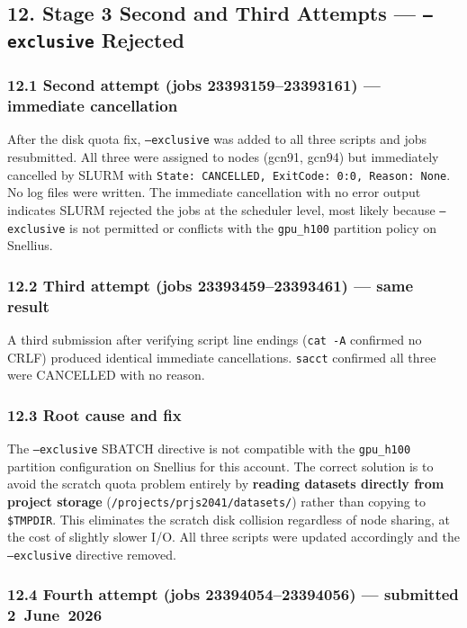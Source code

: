 \subsection*{12. Stage 3 Second and Third Attempts — \texttt{--exclusive} Rejected}

\subsubsection*{12.1 Second attempt (jobs 23393159--23393161) — immediate cancellation}

After the disk quota fix, \texttt{--exclusive} was added to all three scripts
and jobs resubmitted. All three were assigned to nodes (gcn91, gcn94) but
immediately cancelled by SLURM with \texttt{State: CANCELLED, ExitCode: 0:0,
Reason: None}. No log files were written. The immediate cancellation with no
error output indicates SLURM rejected the jobs at the scheduler level, most
likely because \texttt{--exclusive} is not permitted or conflicts with the
\texttt{gpu\_h100} partition policy on Snellius.

\subsubsection*{12.2 Third attempt (jobs 23393459--23393461) — same result}

A third submission after verifying script line endings (\texttt{cat -A}
confirmed no CRLF) produced identical immediate cancellations.
\texttt{sacct} confirmed all three were CANCELLED with no reason.

\subsubsection*{12.3 Root cause and fix}

The \texttt{--exclusive} SBATCH directive is not compatible with the
\texttt{gpu\_h100} partition configuration on Snellius for this account.
The correct solution is to avoid the scratch quota problem entirely by
\textbf{reading datasets directly from project storage}
(\texttt{/projects/prjs2041/datasets/}) rather than copying to
\texttt{\$TMPDIR}. This eliminates the scratch disk collision regardless
of node sharing, at the cost of slightly slower I/O. All three scripts
were updated accordingly and the \texttt{--exclusive} directive removed.

\subsubsection*{12.4 Fourth attempt (jobs 23394054--23394056) — submitted 2~June~2026}

